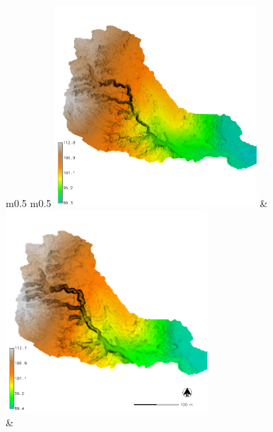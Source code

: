 \documentclass{standalone}
\begin{document}
\scriptsize
\centering 

\begin{tabular}{m{} m{}}
%
{\includegraphics[height=75mm]{../../images/sample_data/elevation_2016.png}} & 
{\includegraphics[height=75mm]{../../images/ss_transport/shaded_relief_carto.png}}\\
%
 & 
\\
%
\label{fig:evolution}
\end{tabular}
\end{document}
